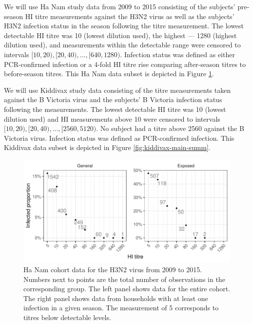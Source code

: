 We will use Ha Nam study data from 2009 to 2015 consisting of the subjects' pre-season HI titre measurements against the H3N2 virus as well as the subjects' H3N2 infection status in the season following the titre measurement. The lowest detectable HI titre was 10 (lowest dilution used), the highest --- 1280 (highest dilution used), and measurements within the detectable range were censored to intervals $[10, 20), [20, 40), ..., [640, 1280)$. Infection status was defined as either PCR-confirmed infection or a 4-fold HI titre rise comparing after-season titres to before-season titres. This Ha Nam data subset is depicted in Figure \ref{fig:hanam-hi-summ-h3n2}.

We will use Kiddivax study data consisting of the titre measurements taken against the B Victoria virus and the subjects' B Victoria infection status following the measurements. The lowest detectable HI titre was 10 (lowest dilution used) and HI measurements above 10 were censored to intervals $[10, 20), [20, 40), ..., [2560, 5120)$. No subject had a titre above 2560 against the B Victoria virus. Infection status was defined as PCR-confirmed infection. This Kiddivax data subset is depicted in Figure \ref{fig:kiddivax-main-summ}.

\begin{figure}[htp]
    \centering
    \includegraphics[width=1\textwidth]{../data-plot/hanam-hi-summ-h3n2-light.pdf}
    \caption{
        Ha Nam cohort data for the H3N2 virus from 2009 to 2015. Numbers next to points are the total number of observations in the corresponding group. The left panel shows data for the entire cohort. The right panel shows data from households with at least one infection in a given season. The measurement of 5 corresponds to titres below detectable levels.
    }
    \label{fig:hanam-hi-summ-h3n2}
\end{figure}

